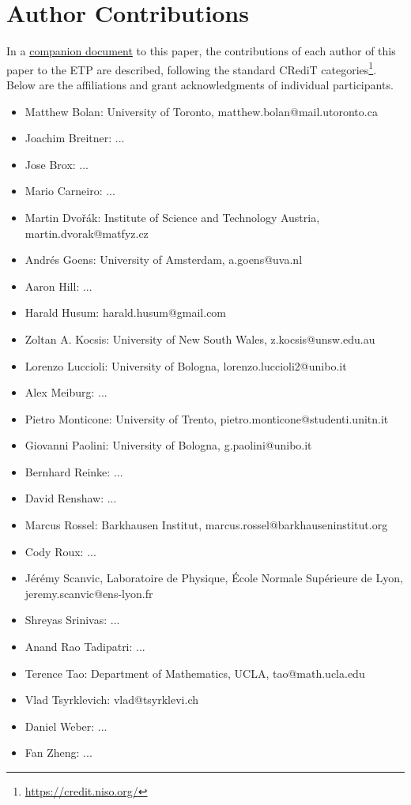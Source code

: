 \section{Author Contributions}

In a \href{https://github.com/teorth/equational_theories/blob/main/paper/contributions.md}{companion document} to this paper, the contributions of each author of this paper to the ETP are described, following the standard CRediT categories\footnote{\url{https://credit.niso.org/}}.  Below are the affiliations and grant acknowledgments of individual participants.


\begin{itemize}
    \item Matthew Bolan: University of Toronto, matthew.bolan@mail.utoronto.ca
    \item Joachim Breitner: ...
    \item Jose Brox: ...
    \item Mario Carneiro: ...
    \item Martin Dvo\v{r}\'ak: Institute of Science and Technology Austria, martin.dvorak@matfyz.cz
    \item Andr\'es Goens: University of Amsterdam, a.goens@uva.nl
    \item Aaron Hill: ...
    \item Harald Husum: harald.husum@gmail.com
    \item Zoltan A. Kocsis: University of New South Wales, z.kocsis@unsw.edu.au
    \item Lorenzo Luccioli: University of Bologna, lorenzo.luccioli2@unibo.it
    \item Alex Meiburg: ...
    \item Pietro Monticone: University of Trento, pietro.monticone@studenti.unitn.it
    \item Giovanni Paolini: University of Bologna, g.paolini@unibo.it
    \item Bernhard Reinke: ...
    \item David Renshaw: ...
    \item Marcus Rossel: Barkhausen Institut, marcus.rossel@barkhauseninstitut.org
    \item Cody Roux: ...
    \item J\'er\'emy Scanvic, Laboratoire de Physique, École Normale Supérieure de Lyon, jeremy.scanvic@ens-lyon.fr
    \item Shreyas Srinivas: ...
    \item Anand Rao Tadipatri: ...
    \item Terence Tao: Department of Mathematics, UCLA, tao@math.ucla.edu
    \item Vlad Tsyrklevich: vlad@tsyrklevi.ch
    \item Daniel Weber: ...
    \item Fan Zheng: ...
\end{itemize}

